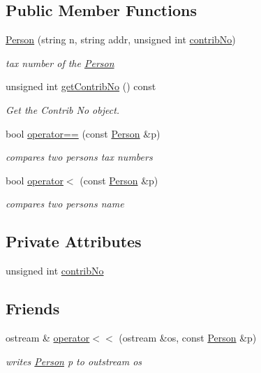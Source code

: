 \subsection*{Public Member Functions}
\begin{DoxyCompactItemize}
\item 
\hyperlink{classPerson_aa4a247daff8ad28db9caac292dd2522b}{Person} (string n, string addr, unsigned int \hyperlink{classPerson_a55eea8ffb71b88d84ea43a6be15a2eb4}{contrib\+No})
\begin{DoxyCompactList}\small\item\em tax number of the \hyperlink{classPerson}{Person} \end{DoxyCompactList}\item 
unsigned int \hyperlink{classPerson_a8eb4c40211e1d1d3356d10df7f4ffcd7}{get\+Contrib\+No} () const
\begin{DoxyCompactList}\small\item\em Get the Contrib No object. \end{DoxyCompactList}\item 
bool \hyperlink{classPerson_a8b98ec6713875725a005f2b0ad19fa4c}{operator==} (const \hyperlink{classPerson}{Person} \&p)
\begin{DoxyCompactList}\small\item\em compares two person\textquotesingle{}s tax numbers \end{DoxyCompactList}\item 
bool \hyperlink{classPerson_aa61a8197d96d683b6c779a32382349cc}{operator$<$} (const \hyperlink{classPerson}{Person} \&p)
\begin{DoxyCompactList}\small\item\em compares two person\textquotesingle{}s name \end{DoxyCompactList}\end{DoxyCompactItemize}
\subsection*{Private Attributes}
\begin{DoxyCompactItemize}
\item 
unsigned int \hyperlink{classPerson_a55eea8ffb71b88d84ea43a6be15a2eb4}{contrib\+No}
\end{DoxyCompactItemize}
\subsection*{Friends}
\begin{DoxyCompactItemize}
\item 
ostream \& \hyperlink{classPerson_a520925d2df99c77933138568a48577dd}{operator$<$$<$} (ostream \&os, const \hyperlink{classPerson}{Person} \&p)
\begin{DoxyCompactList}\small\item\em writes \hyperlink{classPerson}{Person} p to outstream os \end{DoxyCompactList}\end{DoxyCompactItemize}


